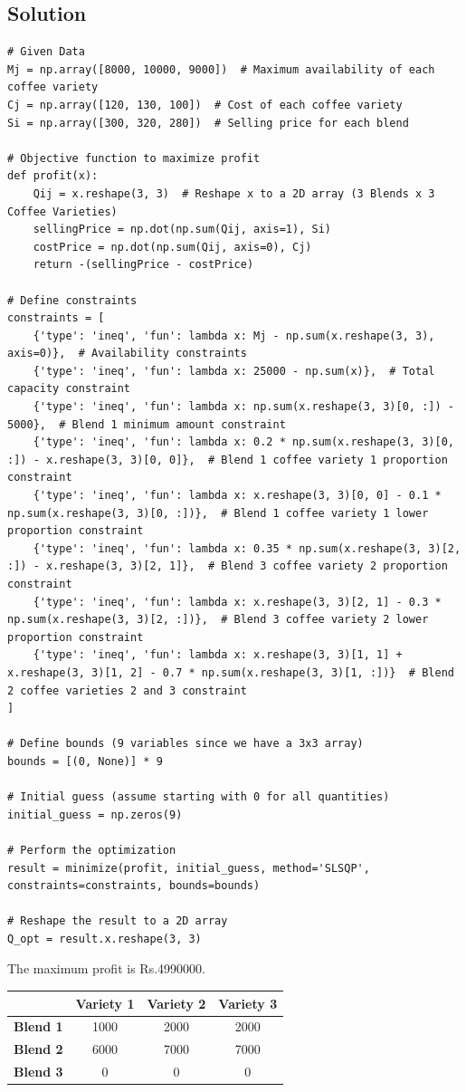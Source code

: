 \documentclass[12pt,a4paper,oneside]{paper} %
\newcommand{\sol}{%
    {\subsection{Solution}} %
    \addcontentsline{toc}{subsection}{Solution}
}
\begin{document}
\sol
\begin{verbatim}
# Given Data
Mj = np.array([8000, 10000, 9000])  # Maximum availability of each coffee variety
Cj = np.array([120, 130, 100])  # Cost of each coffee variety
Si = np.array([300, 320, 280])  # Selling price for each blend

# Objective function to maximize profit
def profit(x):
    Qij = x.reshape(3, 3)  # Reshape x to a 2D array (3 Blends x 3 Coffee Varieties)
    sellingPrice = np.dot(np.sum(Qij, axis=1), Si)
    costPrice = np.dot(np.sum(Qij, axis=0), Cj)
    return -(sellingPrice - costPrice)

# Define constraints
constraints = [
    {'type': 'ineq', 'fun': lambda x: Mj - np.sum(x.reshape(3, 3), axis=0)},  # Availability constraints
    {'type': 'ineq', 'fun': lambda x: 25000 - np.sum(x)},  # Total capacity constraint
    {'type': 'ineq', 'fun': lambda x: np.sum(x.reshape(3, 3)[0, :]) - 5000},  # Blend 1 minimum amount constraint
    {'type': 'ineq', 'fun': lambda x: 0.2 * np.sum(x.reshape(3, 3)[0, :]) - x.reshape(3, 3)[0, 0]},  # Blend 1 coffee variety 1 proportion constraint
    {'type': 'ineq', 'fun': lambda x: x.reshape(3, 3)[0, 0] - 0.1 * np.sum(x.reshape(3, 3)[0, :])},  # Blend 1 coffee variety 1 lower proportion constraint
    {'type': 'ineq', 'fun': lambda x: 0.35 * np.sum(x.reshape(3, 3)[2, :]) - x.reshape(3, 3)[2, 1]},  # Blend 3 coffee variety 2 proportion constraint
    {'type': 'ineq', 'fun': lambda x: x.reshape(3, 3)[2, 1] - 0.3 * np.sum(x.reshape(3, 3)[2, :])},  # Blend 3 coffee variety 2 lower proportion constraint
    {'type': 'ineq', 'fun': lambda x: x.reshape(3, 3)[1, 1] + x.reshape(3, 3)[1, 2] - 0.7 * np.sum(x.reshape(3, 3)[1, :])}  # Blend 2 coffee varieties 2 and 3 constraint
]

# Define bounds (9 variables since we have a 3x3 array)
bounds = [(0, None)] * 9

# Initial guess (assume starting with 0 for all quantities)
initial_guess = np.zeros(9)

# Perform the optimization
result = minimize(profit, initial_guess, method='SLSQP', constraints=constraints, bounds=bounds)

# Reshape the result to a 2D array
Q_opt = result.x.reshape(3, 3)
\end{verbatim}
\vspace{0.5cm}

\noindent The maximum profit is Rs.4990000.
\begin{table}[H]
  \centering
  \begin{tabular}{||c|c|c|c||}
    \hline
                     & \textbf{Variety 1} & \textbf{Variety 2} & \textbf{Variety 3} \\
    \hline
    \textbf{Blend 1} & 1000               & 2000               & 2000               \\
    \hline
    \textbf{Blend 2} & 6000               & 7000               & 7000               \\
    \hline
    \textbf{Blend 3} & 0                  & 0                  & 0                  \\
    \hline
  \end{tabular}
\end{table}
\end{document}
